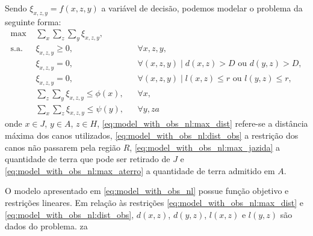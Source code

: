 Sendo $\xi_{x, z, y} = f(x, z, y)$ a variável de decisão, podemos modelar o
problema da seguinte forma:
\begin{subequations}
    \begin{align}
        \text{max } & \sum_{x} \sum_{z} \sum_{y} \xi_{x, z, y},
        \label{eq:model_with_obs_nl:obj_func} \\
        \text{s.a. } & \xi_{x, z, y} \geq 0, && \forall x, z, y,
        \label{eq:model_with_obs_nl:var} \\
        & \xi_{x, z, y} = 0, && \forall (x, z, y) \mid d(x, z) > D \text{ ou } 
        d(y, z) > D,
        \label{eq:model_with_obs_nl:max_dist} \\
        & \xi_{x, z, y} = 0, && \forall (x, z, y) \mid l(x, z) \leq r \text{ ou }
        l(y, z) \leq r,
        \label{eq:model_with_obs_nl:dist_obs} \\
        & \sum_{z} \sum_{y} \xi_{x, z, y} \leq \phi(x), && \forall x,
        \label{eq:model_with_obs_nl:max_jazida} \\
        & \sum_{x} \sum_{z} \xi_{x, z, y} \leq \psi(y), && \forall y,
        \label{eq:model_with_obs_nl:max_aterro}
  za  \end{align}
    \label{eq:model_with_obs_nl}
\end{subequations}
onde $x \in J$, $y \in A$, $z \in H$, \eqref{eq:model_with_obs_nl:max_dist}
refere-se a distância máxima dos canos utilizados,
\eqref{eq:model_with_obs_nl:dist_obs} a restrição dos canos não passarem pela
região $R$, \eqref{eq:model_with_obs_nl:max_jazida} a quantidade de terra que pode
ser retirado de $J$ e \eqref{eq:model_with_obs_nl:max_aterro} a quantidade de terra
admitido em $A$.

O modelo apresentado em \eqref{eq:model_with_obs_nl} possue função objetivo e
restrições lineares. Em relação \`{a}s restrições
\eqref{eq:model_with_obs_nl:max_dist} e \eqref{eq:model_with_obs_nl:dist_obs},
$d(x, z)$, $d(y, z)$, $l(x, z)$ e $l(y, z)$ são dados do problema.
za
